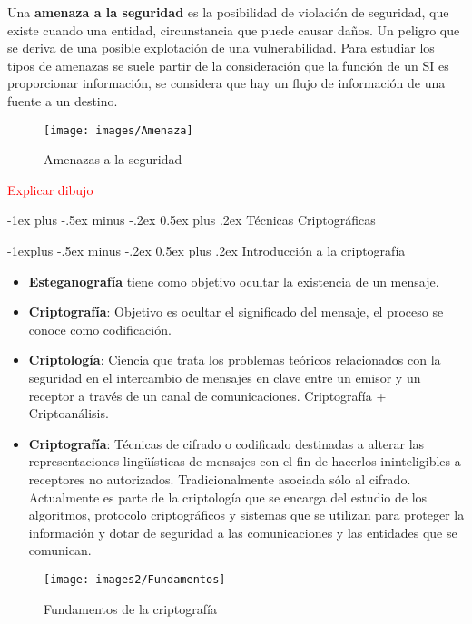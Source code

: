 \documentclass[10pt,portrait, twocolumn]{article}
\makeatletter
\renewcommand{\section}{\@startsection{section}{1}{0mm}%
                                {-1ex plus -.5ex minus -.2ex}%
                                {0.5ex plus .2ex}%
                                {\normalfont\large\bfseries}}
\renewcommand{\subsection}{\@startsection{subsection}{2}{0mm}%
                                {-1explus -.5ex minus -.2ex}%
                                {0.5ex plus .2ex}%
                                {\normalfont\normalsize\bfseries}}
\makeatother
\begin{document}
Una \textbf{amenaza a la seguridad} es la posibilidad de violación de seguridad, que existe cuando una entidad, circunstancia que puede causar daños. Un peligro que se deriva de una posible explotación de una vulnerabilidad. Para estudiar los tipos de amenazas se suele partir de la consideración que la función de un SI es proporcionar información, se considera que hay un flujo de información de una fuente a un destino.

	\begin{figure}[ht!]
	\centering
	\texttt{[image: images/Amenaza]}
	\caption{Amenazas a la seguridad}
	\label{fig:Triada}
	\end{figure}

\textcolor{red}{Explicar dibujo}




\section{Técnicas Criptográficas}

	\subsection{Introducción a la criptografía}
	
	\begin{itemize}
		\item \textbf{Esteganografía} tiene como objetivo ocultar la existencia de un mensaje.
		\item \textbf{Criptografía}: Objetivo es ocultar el significado del mensaje, el proceso se conoce como codificación.
		\item \textbf{Criptología}: Ciencia que trata los problemas teóricos relacionados con la seguridad en el intercambio de mensajes en clave entre un emisor y un receptor a través de un canal de comunicaciones. Criptografía + Criptoanálisis.
		\item \textbf{Criptografía}: Técnicas de cifrado o codificado destinadas a alterar las representaciones lingüísticas de mensajes con el fin de hacerlos ininteligibles a receptores no autorizados. Tradicionalmente asociada sólo al cifrado. Actualmente es parte de la criptología que se encarga del estudio de los algoritmos, protocolo criptográficos y sistemas que se utilizan para proteger la información y dotar de seguridad a las comunicaciones y las entidades que se comunican.
	\end{itemize}
	
	\begin{figure}[ht!]
	\centering
	\texttt{[image: images2/Fundamentos]}
	\caption{Fundamentos de la criptografía}
	\label{fig:Triada}
	\end{figure}
\end{document}

